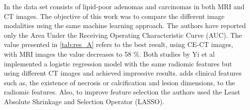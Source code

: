 \documentclass{article}
\begin{document}
In \cite{Ho2019} the data set consists of lipid-poor adenomas and carcinomas in
both MRI and CT images. The objective of this work was to compare the different
image modalities using the same machine learning approach. The authors have
reported only the Area Under the Receiving Operating Characteristic Curve (AUC).
The value presented in \ref{tab:res_A} refers to the best result, using CE-CT
images, with MRI images the value decreases to 58 \%.
Both studies by Yi et al \cite{Yi2018, Yi20181} implemented a logistic regression model with the same radiomic features
but using different CT images and achieved impressive results. \cite{Yi2018} adds clinical features
such as, the existence of necrosis or calcification and lesion dimensions, to
the radiomic features. Also, to improve feature selection the authors used the
Least Absolute Shrinkage and Selection Operator (LASSO).
\end{document}
